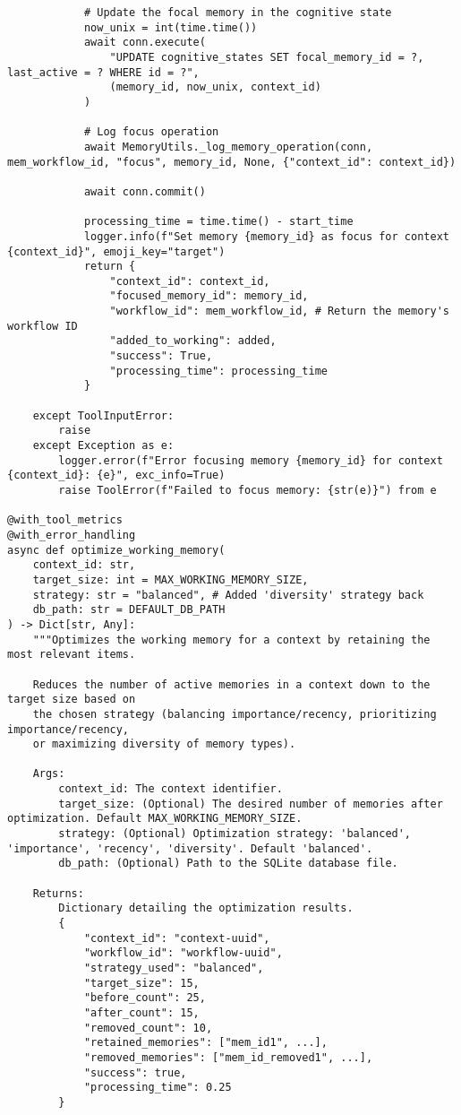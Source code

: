 \documentclass[12pt,a4paper]{article}
\begin{document}
\begin{pageablecode}
\begin{verbatim}
            # Update the focal memory in the cognitive state
            now_unix = int(time.time())
            await conn.execute(
                "UPDATE cognitive_states SET focal_memory_id = ?, last_active = ? WHERE id = ?",
                (memory_id, now_unix, context_id)
            )

            # Log focus operation
            await MemoryUtils._log_memory_operation(conn, mem_workflow_id, "focus", memory_id, None, {"context_id": context_id})

            await conn.commit()

            processing_time = time.time() - start_time
            logger.info(f"Set memory {memory_id} as focus for context {context_id}", emoji_key="target")
            return {
                "context_id": context_id,
                "focused_memory_id": memory_id,
                "workflow_id": mem_workflow_id, # Return the memory's workflow ID
                "added_to_working": added,
                "success": True,
                "processing_time": processing_time
            }

    except ToolInputError:
        raise
    except Exception as e:
        logger.error(f"Error focusing memory {memory_id} for context {context_id}: {e}", exc_info=True)
        raise ToolError(f"Failed to focus memory: {str(e)}") from e

@with_tool_metrics
@with_error_handling
async def optimize_working_memory(
    context_id: str,
    target_size: int = MAX_WORKING_MEMORY_SIZE,
    strategy: str = "balanced", # Added 'diversity' strategy back
    db_path: str = DEFAULT_DB_PATH
) -> Dict[str, Any]:
    """Optimizes the working memory for a context by retaining the most relevant items.

    Reduces the number of active memories in a context down to the target size based on
    the chosen strategy (balancing importance/recency, prioritizing importance/recency,
    or maximizing diversity of memory types).

    Args:
        context_id: The context identifier.
        target_size: (Optional) The desired number of memories after optimization. Default MAX_WORKING_MEMORY_SIZE.
        strategy: (Optional) Optimization strategy: 'balanced', 'importance', 'recency', 'diversity'. Default 'balanced'.
        db_path: (Optional) Path to the SQLite database file.

    Returns:
        Dictionary detailing the optimization results.
        {
            "context_id": "context-uuid",
            "workflow_id": "workflow-uuid",
            "strategy_used": "balanced",
            "target_size": 15,
            "before_count": 25,
            "after_count": 15,
            "removed_count": 10,
            "retained_memories": ["mem_id1", ...],
            "removed_memories": ["mem_id_removed1", ...],
            "success": true,
            "processing_time": 0.25
        }


\end{verbatim}
\end{pageablecode}
\end{document}
